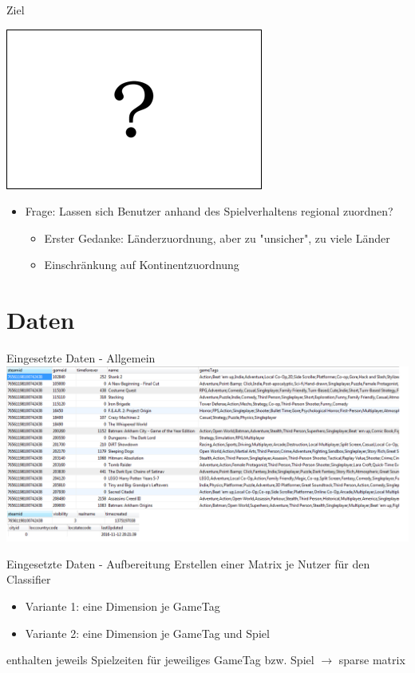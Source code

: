 \documentclass[12pt]{beamer}
\begin{document}
\begin{frame}{Ziel}
	\centerline{\includegraphics[scale=0.3]{img/question_flag.png}}
	\begin{itemize}
		\item Frage: Lassen sich Benutzer anhand des Spielverhaltens regional zuordnen?
			\begin{itemize}
			\item Erster Gedanke: Länderzuordnung, aber zu "unsicher", zu viele Länder
			\item Einschränkung auf Kontinentzuordnung
			\end{itemize}
	\end{itemize}
\end{frame}

\section{Daten}
\begin{frame}{Eingesetzte Daten - Allgemein}
	\includegraphics[scale=0.5]{img/steam_richard_info.png}
\end{frame}


\begin{frame}{Eingesetzte Daten - Aufbereitung}
	Erstellen einer Matrix je Nutzer für den Classifier
	\begin{itemize}
		\item Variante 1: eine Dimension je GameTag
		\item Variante 2: eine Dimension je GameTag und Spiel
	\end{itemize}
	enthalten jeweils Spielzeiten für jeweiliges GameTag bzw. Spiel
	$\rightarrow$ sparse matrix
	
\end{frame}
\end{document}
